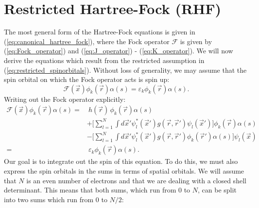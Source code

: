 \section{Restricted Hartree-Fock (RHF)}
\label{sec:RHF}
The most general form of the Hartree-Fock equations is given in (\ref{eq:canonical_hartree_fock}), where the Fock operator $\mathcal{F}$ is given by (\ref{eq:Fock_operator}) and
(\ref{eq:J_operator}) - (\ref{eq:K_operator}). We will now derive the equations which result from the restricted assumption in (\ref{eq:restricted_spinorbitals}).
Without loss of generality, we may assume that the spin orbital on which the Fock operator acts is spin up:
\begin{equation}
\mathcal F(\vec x)\phi_k(\vec r) \alpha(s) = \varepsilon_k\phi_k(\vec r)\alpha(s).
\end{equation}
Writing out the Fock operator explicitly:
\begin{equation}
\begin{split}
 \mathcal{F}(\vec x)\phi_k(\vec r)\alpha(s)  = &\ h(\vec r)\,\phi_k(\vec r)\alpha(s) \\
                      &  + \Big[\sum_{l=1}^N\int d\vec x'\psi^*_l(\vec x')g(\vec r, \vec r')\psi_l(\vec x')\Big]\phi_k(\vec r)\alpha(s) \\
                       &    - \Big[\sum_{l=1}^N\int d\vec x'\psi^*_l(\vec x')g(\vec r, \vec r')\phi_k(\vec r')\alpha(s)\Big]\psi_l(\vec x) \\
                       = &\  \varepsilon_k\phi_k(\vec r)\alpha(s).
\end{split}
\end{equation}
Our goal is to integrate out the spin of this equation. To do this, we must also express the spin orbitals in the sums in terms of spatial orbitals. We will assume that
$N$ is an even number of electrons and that we are dealing with a closed shell determinant. This means that both sums, which run from 0 to $N$, can be split
into two sums which run from 0 to $N/2$:
